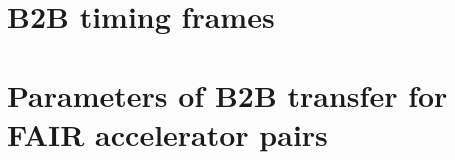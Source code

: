 \documentclass[12pt,twoside]{report}
\begin{document}
%
\appendix
\chapter{B2B timing frames}

\chapter{Parameters of B2B transfer for FAIR accelerator pairs}






\renewcommand\chaptername{Publications}
\pagestyle{empty}


\renewcommand\chaptername{}
\pagestyle{empty}

%
\end{document}
